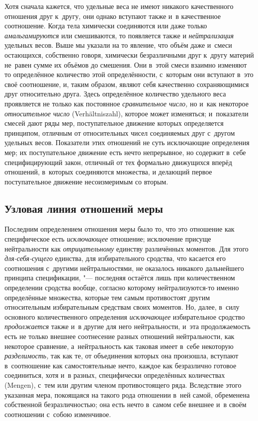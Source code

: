 Хотя сначала кажется, что удельные веса не имеют никакого качественного
отношения друг к~другу, они однако вступают также и~в качественное соотношение.
Когда тела химически соединяются или даже только {\em амальгамируются} или
смешиваются, то появляется также и {\em нейтрализация} удельных весов. Выше
мы указали на то явление, что объём даже и~смеси остающихся, собственно говоря,
химически безразличными друг к~другу материй не~равен сумме их объёмов до
смешения. Они в~этой смеси взаимно изменяют то определённое количество этой
определённости, с~которым они вступают в~это своё соотношение, и, таким
образом, являют себя качественно сохраняющимися друг относительно друга. Здесь
определённое количество удельного веса проявляется не только как постоянное
{\em сравнительное число,} но и~как некоторое {\em относительное число}
(Ver\-hält\-nis\-zahl), которое может изменяться; и~показатели смесей дают ряды
мер, поступательное движение которых определяется принципом, отличным от
относительных чисел соединяемых друг с~другом удельных весов. Показатели
этих отношений не суть исключающие определения мер; их поступательное движение
есть нечто непрерывное, но содержит в~себе специфицирующий закон, отличный от
тех формально движущихся вперёд отношений, в~которых соединяются множества, и
делающий первое поступательное движение несоизмеримым со вторым.

\subsection{Узловая линия отношений меры}

Последним определением отношения меры было то, что это отношение как специфическое есть
{\em исключающее} отношение; исключение присуще нейтральности как {\em отрицательному}
единству различённых моментов. Для этого {\em для-себя-сущего} единства, для
избирательного сродства, что касается его соотношения с~другими
нейтральностями, не оказалось никакого дальнейшего принципа спецификации, "---
последняя остаётся лишь при количественном определении сродства вообще,
согласно которому нейтрализуются-то именно определённые множества, которые тем
самым противостоят другим относительным избирательным средствам своих моментов.
Но, далее, в~силу основного количественного определения {\em исключающее}
избирательное сродство {\em продолжается} также и~в другие для него
нейтральности, и~эта продолжаемость есть не только внешнее соотнесение разных
отношений нейтральности, как некоторое сравнение, а~нейтральность как таковая
имеет в~себе некоторую {\em разделимость,} так как те, от объединения которых
она произошла, вступают в~соотношение как самостоятельные нечто, каждое как
безразлично готовое соединиться, хотя и~в разных, специфически определённых
количествах (Mengen), с~тем или другим членом противостоящего ряда. Вследствие этого
указанная мера, покоящаяся на такого рода отношении в~ней самой, обременена
собственной безразличностью; она есть нечто в~самом себе внешнее и~в своём
соотношении с~собою изменчивое.

